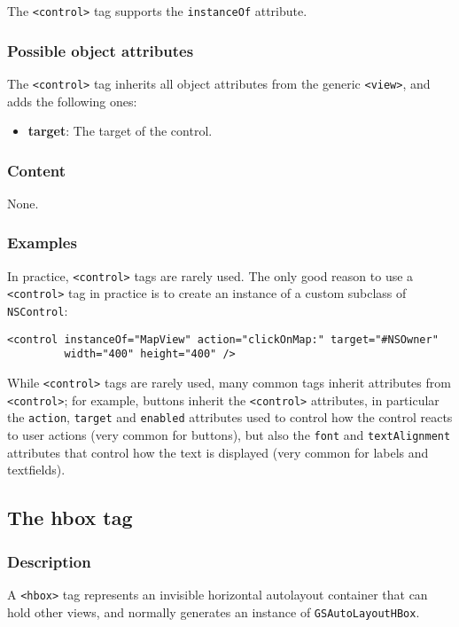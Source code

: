 The \texttt{<control>} tag supports the \texttt{instanceOf} attribute.

\subsubsection{Possible object attributes}
The \texttt{<control>} tag inherits all object attributes from the
generic \texttt{<view>}, and adds the following ones:
\begin{itemize}
\item {\bf target}: The target of the control.
\end{itemize}

\subsubsection{Content}
None.

\subsubsection{Examples}
In practice, \texttt{<control>} tags are rarely used.  The only good
reason to use a \texttt{<control>} tag in practice is to create an
instance of a custom subclass of \texttt{NSControl}:
\begin{verbatim}
<control instanceOf="MapView" action="clickOnMap:" target="#NSOwner" 
         width="400" height="400" />
\end{verbatim}

While \texttt{<control>} tags are rarely used, many common tags
inherit attributes from \texttt{<control>}; for example, buttons
inherit the \texttt{<control>} attributes, in particular the
\texttt{action}, \texttt{target} and \texttt{enabled} attributes used
to control how the control reacts to user actions (very common for
buttons), but also the \texttt{font} and \texttt{textAlignment}
attributes that control how the text is displayed (very common for
labels and textfields).

\subsection{The hbox tag}

\subsubsection{Description}
A \texttt{<hbox>} tag represents an invisible horizontal autolayout
container that can hold other views, and normally generates an
instance of \texttt{GSAutoLayoutHBox}.

